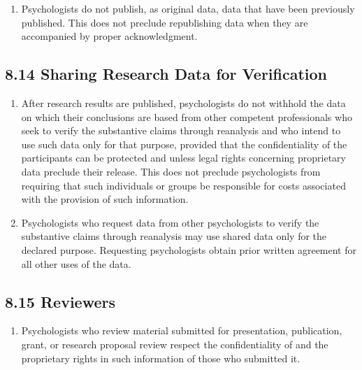 \begin{enumerate}

\item Psychologists do not publish, as original data, data that have been previously published. This does not preclude
republishing data when they are accompanied by proper acknowledgment.

\end{enumerate}


\subsection{8.14 Sharing Research Data for Verification}


\begin{enumerate}

\item After research results are published, psychologists do not withhold the data on which their conclusions are based from other competent professionals who seek to verify the substantive claims through reanalysis and who intend to use such data only for that purpose, provided that the confidentiality of the participants can be protected and unless legal rights concerning proprietary data preclude their release. This does not preclude psychologists from requiring that such individuals or groups be responsible for costs associated with the provision of such information.


\item Psychologists who request data from other psychologists to verify the substantive claims through reanalysis may use shared data only for the declared purpose. Requesting psychologists obtain prior written agreement for all other uses of the data.

\end{enumerate}


\subsection{8.15 Reviewers}


\begin{enumerate}

\item Psychologists who review material submitted for presentation, publication, grant, or research proposal review
respect the confidentiality of and the proprietary rights in such information of those who submitted it.

\end{enumerate}





